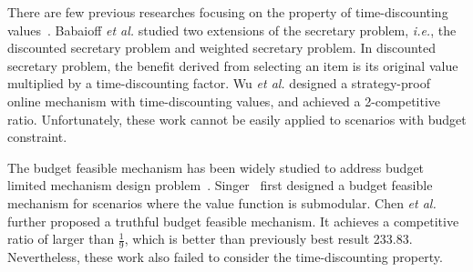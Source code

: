 \documentclass[conference,compsocconf,letterpaper,10pt]{IEEEtran}
\newcommand{\ie}{{\em i.e.}}
\newcommand{\et}{{\em et al. }}
\begin{document}
There are few previous researches focusing on the property of time-discounting values~\cite{Frazier:2014:IE:2600057.2602897,Olariu:2014:AIA:2581555.2581569,Fujita:2014:ASA:2615731.2616036}. Babaioff \et\cite{babaioff2009secretary} studied two extensions of the secretary problem, \ie, the discounted secretary problem and weighted secretary problem. In discounted secretary problem, the benefit derived from selecting an item is its original value multiplied by a time-discounting factor. Wu \et\cite{wu2014strategy} designed a strategy-proof online mechanism with time-discounting values, and achieved a 2-competitive ratio. Unfortunately, these work cannot be easily applied to scenarios with budget constraint. 

The budget feasible mechanism has been widely studied to address budget limited mechanism design problem~\cite{Zhao:2016:BOI:3001647.3001648,Balkanski:2015:MFA:2764468.2764505,Chan:2016:BFM:2936924.2936945,Goel:2014:CAB:2600057.2602851,Lee:2016:MRV:2940716.2940745,Lu:2015:IEG:2764468.2764500,Goel:2015:PCA:2799630.2757277}. Singer~\cite{singer2010budget} first designed a budget feasible mechanism for scenarios where the value function is submodular. Chen \et\cite{chen2011approximability} further proposed a truthful budget feasible mechanism. It achieves a competitive ratio of larger than $\frac{1}{9}$, which is better than previously best result 233.83. Nevertheless, these work also failed to consider the time-discounting property.
\end{document}
